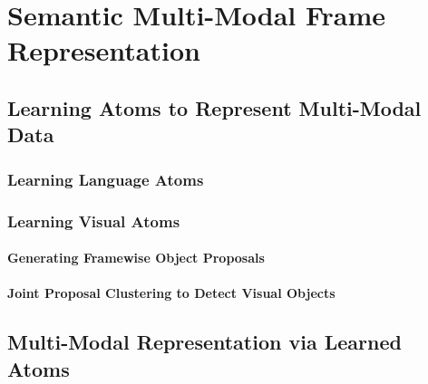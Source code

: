 \section{Semantic Multi-Modal Frame Representation}
\subsection{Learning Atoms to Represent Multi-Modal Data}
\subsubsection{Learning Language Atoms}
\subsubsection{Learning Visual Atoms}
\paragraph{Generating Framewise Object Proposals}
\paragraph{Joint Proposal Clustering to Detect Visual Objects}
\subsection{Multi-Modal Representation via Learned Atoms}
